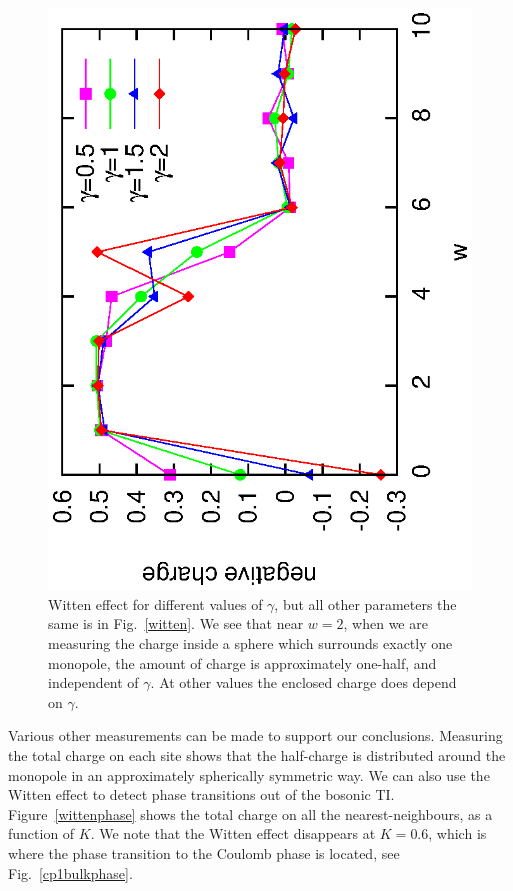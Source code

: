 \documentclass[prb,twocolumn]{revtex4-1}
\newcommand{\scripty}[1]{w}
\begin{document}
\begin{figure}
\includegraphics[angle=-90,width=0.9\linewidth]{figures/wittendiff.eps}
\caption{Witten effect for different values of $\gamma$, but all other parameters the same is in Fig.~\ref{witten}. We see that near $\scripty{r}=2$, when we are measuring the charge inside a sphere which surrounds exactly one monopole, the amount of charge is approximately one-half, and independent of $\gamma$. At other values the enclosed charge does depend on $\gamma$.}
\label{diffgamma}
\end{figure}

Various other measurements can be made to support our conclusions. Measuring the total charge on each site shows that the half-charge is distributed around the monopole in an approximately spherically symmetric way. We can also use the Witten effect to detect phase transitions out of the bosonic TI. Figure~\ref{wittenphase} shows the total charge on all the nearest-neighbours, as a function of $K$. We note that the Witten effect disappears at $K=0.6$, which is where the phase transition to the Coulomb phase is located, see Fig.~\ref{cp1bulkphase}.
\end{document}
